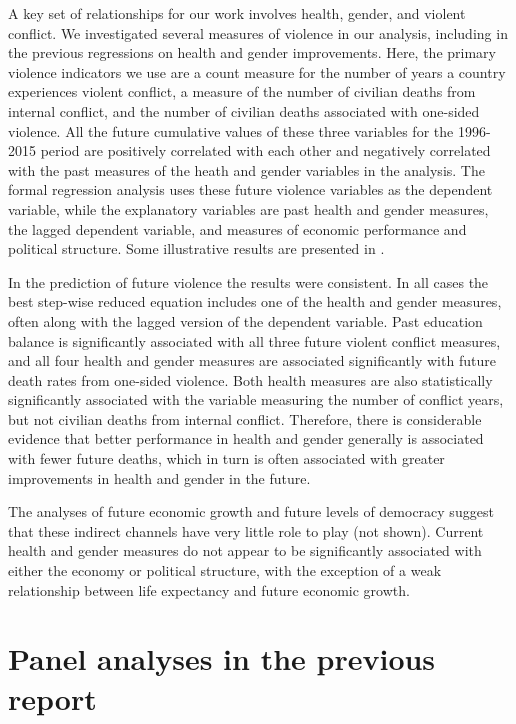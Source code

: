 \documentclass[12pt]{article}
\begin{document}
A key set of relationships for our work involves health, gender, and violent conflict. We investigated several measures of violence in our analysis, including in the previous regressions on health and gender improvements. Here, the primary violence indicators we use are a count measure for the number of years a country experiences violent conflict, a measure of the number of civilian deaths from internal conflict, and the number of civilian deaths associated with one-sided violence. All the future cumulative values of these three variables for the 1996-2015 period are positively correlated with each other and negatively correlated with the past measures of the heath and gender variables in the analysis. The formal regression analysis uses these future violence variables as the dependent variable, while the explanatory variables are past health and gender measures, the lagged dependent variable, and measures of economic performance and political structure. Some illustrative results are presented in .

In the prediction of future violence the results were consistent. In all cases the best step-wise reduced equation includes one of the health and gender measures, often along with the lagged version of the dependent variable. Past education balance is significantly associated with all three future violent conflict measures, and all four health and gender measures are associated significantly with future death rates from one-sided violence. Both health measures are also statistically significantly associated with the variable measuring the number of conflict years, but not civilian deaths from internal conflict. Therefore, there is considerable evidence that better performance in health and gender generally is associated with fewer future deaths, which in turn is often associated with greater improvements in health and gender in the future.

The analyses of future economic growth and future levels of democracy suggest that these indirect channels have very little role to play (not shown). Current health and gender measures do not appear to be significantly associated with either the economy or political structure, with the exception of a weak relationship between life expectancy and future economic growth.

\section{Panel analyses in the previous report}
\label{appendix_panel}
\end{document}
